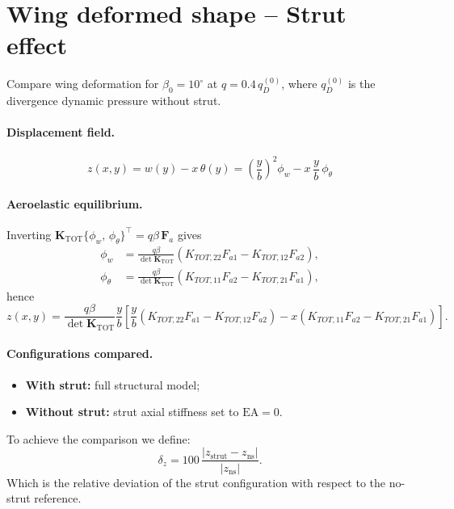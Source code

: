 \renewcommand{\parttitle}{Wing deformed shape -- Strut effect}
\section*{\parttitle}

Compare wing deformation for $\beta_0 = 10^\circ$ at $q = 0.4\,q_D^{(0)}$, where $q_D^{(0)}$ is the divergence dynamic pressure without strut. 

\paragraph{Displacement field.}
\begin{equation}
z(x,y) = w(y) - x\,\theta(y) = \left(\frac{y}{b}\right)^2 \phi_w - x\,\frac{y}{b}\,\phi_\theta
\end{equation}

\paragraph{Aeroelastic equilibrium.}
Inverting $\mathbf{K}_{\mathrm{TOT}}\{\phi_w,\,\phi_\theta\}^\top = q\beta\,\mathbf{F}_a$ gives
\begin{align}
\phi_w &= \frac{q\beta}{\det\mathbf{K}_{\mathrm{TOT}}}
\left(K_{TOT,22}F_{a1} - K_{TOT,12}F_{a2}\right), \\
\phi_\theta &= \frac{q\beta}{\det\mathbf{K}_{\mathrm{TOT}}}
\left(K_{TOT,11}F_{a2} - K_{TOT,21}F_{a1}\right),
\end{align}
hence
\begin{equation}
    \boxed{ z(x,y) = \frac{q\beta}{\det\mathbf{K}_{\mathrm{TOT}}}\frac{y}{b}
\left[\frac{y}{b}\left(K_{TOT,22}F_{a1}-K_{TOT,12}F_{a2}\right)
- x\left(K_{TOT,11}F_{a2}-K_{TOT,21}F_{a1}\right)\right].}
\end{equation}

\paragraph{Configurations compared.}
\begin{itemize}
  \item \textbf{With strut:} full structural model;
  \item \textbf{Without strut:} strut axial stiffness set to $\mathrm{EA}=0$.
\end{itemize}

\noindent To achieve the comparison we define:
\begin{equation}
\delta_z=100\,\frac{|z_{\mathrm{strut}}-z_{\mathrm{ns}}|}{|z_{\mathrm{ns}}|}.
\end{equation}
Which is the relative deviation of the strut configuration with respect to the no-strut reference. 
